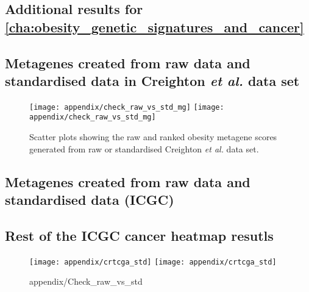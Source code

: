 \begin{appendices}
	\renewcommand{\thesection}{\Alph{chapter}\arabic{section}}

	\chapter{Additional results for \cref{cha:obesity_genetic_signatures_and_cancer}}
	\label{app:a}

	\section{Metagenes created from raw data and standardised data in Creighton \textit{et al.} data set}
	\label{sec:metagenes_created_from_raw_data_vs_standardised_data}
	
	\begin{figure}[htpb]
		\centering
		\texttt{[image: appendix/check\_raw\_vs\_std\_mg]}
		\hfill
		\texttt{[image: appendix/check\_raw\_vs\_std\_mg]}
		\caption{Scatter plots showing the raw and ranked obesity metagene scores generated from raw or standardised Creighton \textit{et al.} data set. }
		\label{fig:appendix/check_raw_vs_std}
	\end{figure}
	
	\section{Metagenes created from raw data and standardised data (ICGC)}
	\label{sec:metagenes_created_from_raw_data_vs_standardised_data_icgc}


	\section{Rest of the ICGC cancer heatmap resutls}
	\label{sec:rest_of_the_icgc_cancer_heatmap_resutls}
	
	\begin{figure}[htpb]
		\centering
		\texttt{[image: appendix/crtcga\_std]}
		\hfill
		\texttt{[image: appendix/crtcga\_std]}
		\caption{appendix/Check_raw_vs_std}
		\label{fig:appendix/check_raw_vs_std}
	\end{figure}


\end{appendices}
